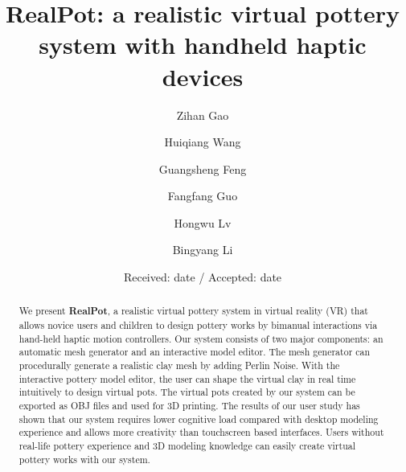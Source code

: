 \documentclass{svjour3}                     %
\begin{document}
\title{RealPot: a realistic virtual pottery system with handheld haptic devices
}


\author{Zihan Gao		\and
		Huiqiang Wang	\and
        Guangsheng Feng	\and
	Fangfang Guo \and
Hongwu Lv \and
Bingyang Li
}



\date{Received: date / Accepted: date}


\maketitle

\begin{abstract}
We present \textbf{RealPot}, a realistic virtual pottery system in virtual reality (VR) that allows novice users and children to design pottery works by bimanual interactions via hand-held haptic motion controllers.
Our system consists of two major components: an automatic mesh generator and an interactive model editor.
The mesh generator can procedurally generate a realistic clay mesh by adding Perlin Noise. With the interactive pottery model editor, the user can shape the virtual clay in real time intuitively to design virtual pots.
The virtual pots created by our system can be exported as OBJ files and used for 3D printing.
The results of our user study has shown that our system requires lower cognitive load compared with desktop modeling experience and allows more creativity than touchscreen based interfaces. Users without real-life pottery experience and 3D modeling knowledge can easily create virtual pottery works with our system.

\end{abstract}
\end{document}
